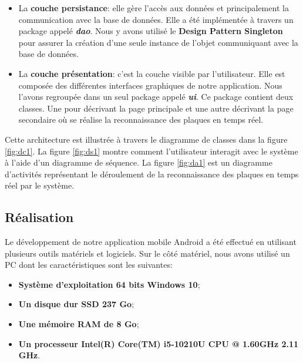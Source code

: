 \begin{itemize}
\begin{itemize}
            \end{itemize}
        
        \item La \textbf{couche persistance}: elle gère l’accès aux données et principalement la communication avec la base de données. Elle a été implémentée à travers un package appelé \textbf{\textit{dao}}. Nous y avons utilisé le \textbf{Design Pattern Singleton} pour assurer la création d'une seule instance de l'objet communiquant avec la base de données. 
        
        \item La \textbf{couche présentation}: c’est la couche visible par l’utilisateur. Elle est composée des différentes interfaces graphiques de notre application. Nous l’avons regroupée dans un seul package appelé \textbf{\textit{ui}}. Ce package contient deux classes. Une pour décrivant la page principale et une autre décrivant la page secondaire où se réalise la reconnaissance des plaques en temps réel. 
    \end{itemize}
    Cette architecture est illustrée à travers le diagramme de classes dans la figure \ref{fig:dc1}. La figure \ref{fig:ds1} montre comment l'utilisateur interagit avec le système à l'aide d'un diagramme de séquence. La figure \ref{fig:da1} est un diagramme d'activités représentant le déroulement de la reconnaissance des plaques en temps réel par le système.
    
    \subsection{Réalisation}
    Le développement de notre application mobile Android a été effectué en utilisant plusieurs outils matériels et logiciels. Sur le côté matériel, nous avons utilisé un PC dont les caractéristiques sont les suivantes:
        \begin{itemize}
            \item \textbf{Système d'exploitation 64 bits Windows 10};
            \item \textbf{Un disque dur SSD 237 Go};
            \item \textbf{Une mémoire RAM de 8 Go};
            \item \textbf{Un processeur Intel(R) Core(TM) i5-10210U CPU @ 1.60GHz   2.11 GHz}.
        \end{itemize}
    
